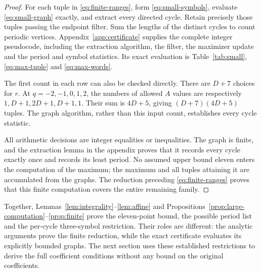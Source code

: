 \begin{proof}
For each tuple in \eqref{eq:finite-ranges}, form \eqref{eq:small-symbols},
evaluate \eqref{eq:small-graph} exactly, and extract every directed
cycle. Retain precisely those tuples passing the endpoint filter.
Sum the lengths of the distinct cycles to count periodic vertices.
Appendix~\ref{app:certificate} supplies the complete integer
pseudocode, including the extraction algorithm, the filter, the
maximizer update and the period and symbol statistics. Its exact
evaluation is Table~\ref{tab:small}, \eqref{eq:max-tuple} and
\eqref{eq:max-words}.

The first count in each row can also be checked directly. There are
$D+7$ choices for $r$. At $q=-2,-1,0,1,2$, the numbers of allowed
$A$ values are respectively $1,D+1,2D+1,D+1,1$. Their sum is
$4D+5$, giving $(D+7)(4D+5)$ tuples. The graph algorithm, rather
than this input count, establishes every cycle statistic.

All arithmetic decisions are integer equalities or inequalities.
The graph is finite, and the extraction lemma in the appendix proves
that it records every cycle exactly once and records its least period.
No assumed upper bound eleven enters the computation of the maximum;
the maximum and all tuples attaining it are accumulated from the graphs.
The reduction preceding \eqref{eq:finite-ranges} proves that this
finite computation covers the entire remaining family.
\end{proof}

Together, Lemmas~\ref{lem:integrality}--\ref{lem:affine} and
Propositions~\ref{prop:large-computation}--\ref{prop:finite} prove
the eleven-point bound, the possible period list and the per-cycle
three-symbol restriction. Their roles are different: the analytic
arguments prove the finite reduction, while the exact certificate
evaluates its explicitly bounded graphs. The next section uses
these established restrictions to derive the full coefficient
conditions without any bound on the original coefficients.
